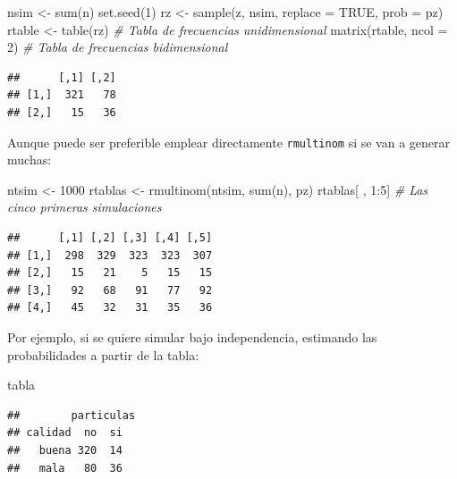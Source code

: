 \documentclass[
]{book}
\newenvironment{Shaded}{\begin{snugshade}}{\end{snugshade}}
\newcommand{\AttributeTok}[1]{\textcolor[rgb]{0.77,0.63,0.00}{#1}}
\newcommand{\CommentTok}[1]{\textcolor[rgb]{0.56,0.35,0.01}{\textit{#1}}}
\newcommand{\ConstantTok}[1]{\textcolor[rgb]{0.00,0.00,0.00}{#1}}
\newcommand{\DecValTok}[1]{\textcolor[rgb]{0.00,0.00,0.81}{#1}}
\newcommand{\FunctionTok}[1]{\textcolor[rgb]{0.00,0.00,0.00}{#1}}
\newcommand{\NormalTok}[1]{#1}
\newcommand{\OtherTok}[1]{\textcolor[rgb]{0.56,0.35,0.01}{#1}}
\newcommand{\SpecialCharTok}[1]{\textcolor[rgb]{0.00,0.00,0.00}{#1}}
\theoremstyle{break}
\theoremstyle{definition}
\theoremstyle{definition}
\theoremstyle{definition}
\theoremstyle{definition}
\theoremstyle{remark}
\begin{document}
\begin{Shaded}
\begin{Highlighting}[]
\NormalTok{nsim }\OtherTok{\textless{}{-}} \FunctionTok{sum}\NormalTok{(n)}
\FunctionTok{set.seed}\NormalTok{(}\DecValTok{1}\NormalTok{)}
\NormalTok{rz }\OtherTok{\textless{}{-}} \FunctionTok{sample}\NormalTok{(z, nsim, }\AttributeTok{replace =} \ConstantTok{TRUE}\NormalTok{, }\AttributeTok{prob =}\NormalTok{ pz)}
\NormalTok{rtable }\OtherTok{\textless{}{-}} \FunctionTok{table}\NormalTok{(rz) }\CommentTok{\# Tabla de frecuencias unidimensional}
\FunctionTok{matrix}\NormalTok{(rtable, }\AttributeTok{ncol =} \DecValTok{2}\NormalTok{) }\CommentTok{\# Tabla de frecuencias bidimensional}
\end{Highlighting}
\end{Shaded}

\begin{verbatim}
##      [,1] [,2]
## [1,]  321   78
## [2,]   15   36
\end{verbatim}

Aunque puede ser preferible emplear directamente \texttt{rmultinom}
si se van a generar muchas:

\begin{Shaded}
\begin{Highlighting}[]
\NormalTok{ntsim }\OtherTok{\textless{}{-}} \DecValTok{1000}
\NormalTok{rtablas }\OtherTok{\textless{}{-}} \FunctionTok{rmultinom}\NormalTok{(ntsim, }\FunctionTok{sum}\NormalTok{(n), pz)}
\NormalTok{rtablas[ , }\DecValTok{1}\SpecialCharTok{:}\DecValTok{5}\NormalTok{] }\CommentTok{\# Las cinco primeras simulaciones}
\end{Highlighting}
\end{Shaded}

\begin{verbatim}
##      [,1] [,2] [,3] [,4] [,5]
## [1,]  298  329  323  323  307
## [2,]   15   21    5   15   15
## [3,]   92   68   91   77   92
## [4,]   45   32   31   35   36
\end{verbatim}

Por ejemplo, si se quiere simular bajo independencia,
estimando las probabilidades a partir de la tabla:

\begin{Shaded}
\begin{Highlighting}[]
\NormalTok{tabla}
\end{Highlighting}
\end{Shaded}

\begin{verbatim}
##        particulas
## calidad  no  si
##   buena 320  14
##   mala   80  36
\end{verbatim}
\end{document}
